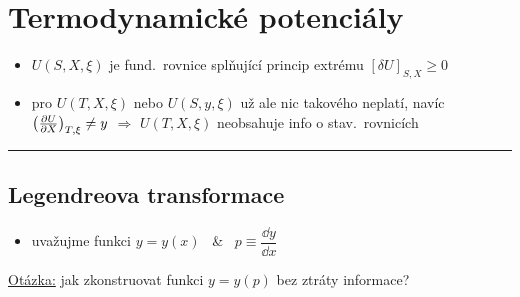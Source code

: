 \providecommand{\tg}{\operatorname{tg}}
\providecommand{\cancel}[1]{\tikz[baseline=(c.base)]{\node[inner sep=0pt](c){$#1$};\draw[NavyBlue](c.south west)--(c.north east);}}
\section{Termodynamické potenciály}

\begin{itemize}
  \item $U(S,X,\xi)$ je fund.\ rovnice splňující princip extrému $[\delta U]_{S,X}\geq 0$
  \item pro $U(T,X,\xi)$ nebo $U(S,y,\xi)$ už ale nic takového neplatí, navíc $\left(\pdv{U}{X}\right)_{T,\xi}\neq y$ $\Rightarrow$ $U(T,X,\xi)$ neobsahuje info o stav.\ rovnicích
\end{itemize}
\noindent\rule{\linewidth}{0.4pt}

\subsection{Legendreova transformace}
\begin{itemize}
  \item uvažujme funkci $y = y(x)$ \ \& \ $p \equiv \dfrac{\dd y}{\dd x}$
\end{itemize}
\underline{Otázka:} jak zkonstruovat funkci $y = y(p)$ bez ztráty informace?

